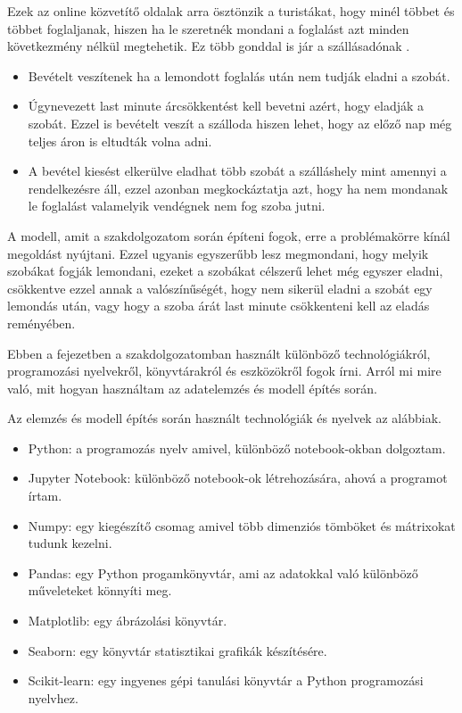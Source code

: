 Ezek az online közvetítő oldalak arra ösztönzik a turistákat, hogy minél többet és többet foglaljanak, hiszen ha le szeretnék mondani a foglalást azt minden következmény nélkül megtehetik. Ez több gonddal is jár a szállásadónak \cite{online_lemondas}.
\begin{itemize}
    \item Bevételt veszítenek ha a lemondott foglalás után nem tudják eladni a szobát.
    \item Úgynevezett last minute árcsökkentést kell bevetni azért, hogy eladják a szobát. Ezzel is bevételt veszít a szálloda hiszen lehet, hogy az előző nap még teljes áron is eltudták volna adni.
    \item A bevétel kiesést elkerülve eladhat több szobát a szálláshely mint amennyi a rendelkezésre áll, ezzel azonban megkockáztatja azt, hogy ha nem mondanak le foglalást valamelyik vendégnek nem fog szoba jutni.
\end{itemize}

A modell, amit a szakdolgozatom során építeni fogok, erre a problémakörre kínál megoldást nyújtani. Ezzel ugyanis egyszerűbb lesz megmondani, hogy melyik szobákat fogják lemondani, ezeket a szobákat célszerű lehet még egyszer eladni, csökkentve ezzel annak a valószínűségét, hogy nem sikerül eladni a szobát egy lemondás után, vagy hogy a szoba árát last minute csökkenteni kell az eladás reményében.



Ebben a fejezetben a szakdolgozatomban használt különböző technológiákról, programozási nyelvekről, könyvtárakról és eszközökről fogok írni. Arról mi mire való, mit hogyan használtam az adatelemzés és modell építés során.

Az elemzés és modell építés során használt technológiák és nyelvek az alábbiak.
\begin{itemize}
\item Python: a programozás nyelv amivel, különböző notebook-okban dolgoztam.
\item Jupyter Notebook: különböző notebook-ok létrehozására, ahová a programot írtam.
\item Numpy: egy kiegészítő csomag amivel több dimenziós tömböket és mátrixokat tudunk kezelni.
\item Pandas:  egy Python progamkönyvtár, ami az adatokkal való különböző műveleteket könnyíti meg.
\item Matplotlib: egy ábrázolási könyvtár.
\item Seaborn: egy könyvtár statisztikai grafikák készítésére.
\item Scikit-learn: egy ingyenes gépi tanulási könyvtár a Python programozási nyelvhez.
\end{itemize}

